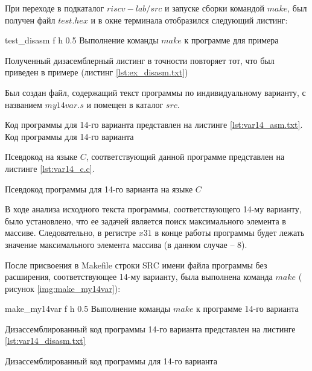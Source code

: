При переходе в подкаталог $riscv-lab/src$ и запуске сборки командой $make$, был получен файл $test.hex$ и в окне терминала отобразился следующий листинг:

{test_disasm} %
{f} %
{h} %
{0.5\textwidth} %
{Выполнение команды $make$ к программе для примера} %

Полученный дизасемблерный листинг в точности повторяет тот, что был приведен в примере (листинг \ref{lst:ex_disasm.txt})

\clearpage

Был создан файл, содержащий текст программы по индивидуальному варианту, с названием $my14var.s$ и помещен в каталог $src$.

Код программы для 14-го варианта представлен на листинге \ref{lst:var14_asm.txt}.
 {Код программы для 14-го варианта}

\clearpage

Псевдокод на языке $C$, соответствующий данной программе представлен на листинге \ref{lst:var14_c.c}.

 {Псевдокод программы для 14-го варианта на языке $C$}

В ходе анализа исходного текста программы, соответствующего 14-му варианту, было установлено, что ее задачей является поиск максимального элемента в массиве. Следовательно, в регистре $x31$ в конце работы программы будет лежать значение максимального элемента массива (в данном случае -- 8).

После присвоения в Makefile строки SRC имени файла программы без расширения, соответствующее 14-му варианту, была выполнена команда $make$ ( рисунок \ref{img:make_my14var}):

{make_my14var} %
{f} %
{h} %
{0.5\textwidth} %
{Выполнение команды $make$ к программе 14-го варианта} %

\clearpage

Дизассемблированный код программы 14-го варианта представлен на листинге \ref{lst:var14_disasm.txt}

 {Дизассемблированный код программы для 14-го варианта}


